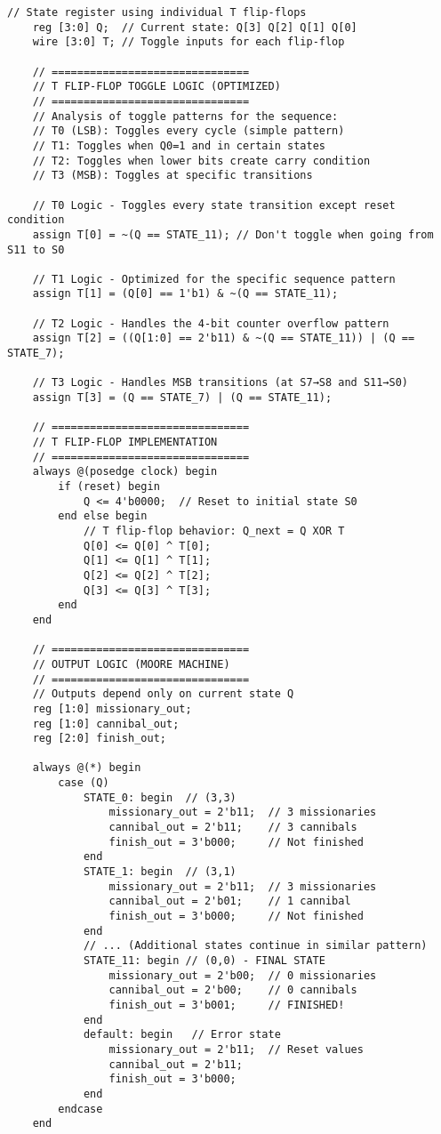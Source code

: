 \documentclass[12pt,letterpaper]{article}
\begin{document}
\begin{lstlisting}[caption={Complete T Flip-Flop State Machine Implementation}]
    // State register using individual T flip-flops
    reg [3:0] Q;  // Current state: Q[3] Q[2] Q[1] Q[0]
    wire [3:0] T; // Toggle inputs for each flip-flop
    
    // ===============================
    // T FLIP-FLOP TOGGLE LOGIC (OPTIMIZED)
    // ===============================
    // Analysis of toggle patterns for the sequence:
    // T0 (LSB): Toggles every cycle (simple pattern)
    // T1: Toggles when Q0=1 and in certain states
    // T2: Toggles when lower bits create carry condition
    // T3 (MSB): Toggles at specific transitions
    
    // T0 Logic - Toggles every state transition except reset condition
    assign T[0] = ~(Q == STATE_11); // Don't toggle when going from S11 to S0
    
    // T1 Logic - Optimized for the specific sequence pattern
    assign T[1] = (Q[0] == 1'b1) & ~(Q == STATE_11);
    
    // T2 Logic - Handles the 4-bit counter overflow pattern
    assign T[2] = ((Q[1:0] == 2'b11) & ~(Q == STATE_11)) | (Q == STATE_7);
    
    // T3 Logic - Handles MSB transitions (at S7→S8 and S11→S0)
    assign T[3] = (Q == STATE_7) | (Q == STATE_11);
    
    // ===============================
    // T FLIP-FLOP IMPLEMENTATION
    // ===============================
    always @(posedge clock) begin
        if (reset) begin
            Q <= 4'b0000;  // Reset to initial state S0
        end else begin
            // T flip-flop behavior: Q_next = Q XOR T
            Q[0] <= Q[0] ^ T[0];
            Q[1] <= Q[1] ^ T[1]; 
            Q[2] <= Q[2] ^ T[2];
            Q[3] <= Q[3] ^ T[3];
        end
    end
    
    // ===============================
    // OUTPUT LOGIC (MOORE MACHINE)
    // ===============================
    // Outputs depend only on current state Q
    reg [1:0] missionary_out;
    reg [1:0] cannibal_out;
    reg [2:0] finish_out;
    
    always @(*) begin
        case (Q)
            STATE_0: begin  // (3,3)
                missionary_out = 2'b11;  // 3 missionaries
                cannibal_out = 2'b11;    // 3 cannibals
                finish_out = 3'b000;     // Not finished
            end
            STATE_1: begin  // (3,1)
                missionary_out = 2'b11;  // 3 missionaries
                cannibal_out = 2'b01;    // 1 cannibal
                finish_out = 3'b000;     // Not finished
            end
            // ... (Additional states continue in similar pattern)
            STATE_11: begin // (0,0) - FINAL STATE
                missionary_out = 2'b00;  // 0 missionaries
                cannibal_out = 2'b00;    // 0 cannibals
                finish_out = 3'b001;     // FINISHED!
            end
            default: begin   // Error state
                missionary_out = 2'b11;  // Reset values
                cannibal_out = 2'b11;
                finish_out = 3'b000;
            end
        endcase
    end
    

\end{lstlisting}
\end{document}
